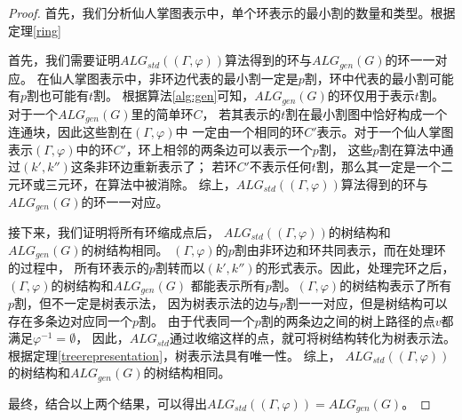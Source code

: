 \begin{proof}
  首先，我们分析仙人掌图表示中，单个环表示的最小割的数量和类型。根据定理\ref{ring}

  首先，我们需要证明$ALG_{std}((\Gamma,\varphi))$算法得到的环与$ALG_{gen}(G)$的环一一对应。
  在仙人掌图表示中，非环边代表的最小割一定是$p$割，环中代表的最小割可能有$p$割也可能有$t$割。
  根据算法\ref{alg:gen}可知，$ALG_{gen}(G)$的环仅用于表示$t$割。对于一个$ALG_{gen}(G)$里的简单环$C$，
  若其表示的$t$割在最小割图中恰好构成一个连通块，因此这些割在$(\Gamma,\varphi)$中
  一定由一个相同的环$C'$表示。对于一个仙人掌图表示$(\Gamma,\varphi)$中的环$C'$，环上相邻的两条边可以表示一个$p$割，
  这些$p$割在算法中通过$(k',k'')$这条非环边重新表示了；
  若环$C'$不表示任何$t$割，那么其一定是一个二元环或三元环，在算法中被消除。
  综上，$ALG_{std}((\Gamma,\varphi))$算法得到的环与$ALG_{gen}(G)$的环一一对应。

  接下来，我们证明将所有环缩成点后，
  $ALG_{std}((\Gamma,\varphi))$的树结构和$ALG_{gen}(G)$的树结构相同。
  $(\Gamma,\varphi)$的$p$割由非环边和环共同表示，而在处理环的过程中，
  所有环表示的$p$割转而以$(k',k'')$的形式表示。因此，处理完环之后，$(\Gamma,\varphi)$的树结构和$ALG_{gen}(G)$
  都能表示所有$p$割。$(\Gamma,\varphi)$的树结构表示了所有$p$割，但不一定是树表示法，
  因为树表示法的边与$p$割一一对应，但是树结构可以存在多条边对应同一个$p$割。
  由于代表同一个$p$割的两条边之间的树上路径的点$v$都满足$\varphi^{-1}=\emptyset$，
  因此，$ALG_{std}$通过收缩这样的点，就可将树结构转化为树表示法。
  根据定理\ref{treerepresentation}，树表示法具有唯一性。
  综上， $ALG_{std}((\Gamma,\varphi))$的树结构和$ALG_{gen}(G)$的树结构相同。

  最终，结合以上两个结果，可以得出$ALG_{std}((\Gamma,\varphi))=ALG_{gen}(G)$。
\end{proof}